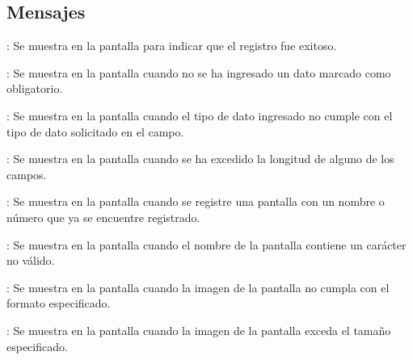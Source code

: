 \subsection{Mensajes}

\begin{Citemize}
	\item {}: Se muestra en la pantalla  para indicar que el registro fue exitoso.
	\item {}: Se muestra en la pantalla  cuando no se ha ingresado un dato marcado como obligatorio.
	\item {}: Se muestra en la pantalla  cuando el tipo de dato ingresado no cumple con el tipo de dato solicitado en el campo.
	\item {}: Se muestra en la pantalla  cuando se ha excedido la longitud de alguno de los campos.
	\item {}: Se muestra en la pantalla  cuando se registre una pantalla con un nombre o número que ya se encuentre registrado.
	\item {}: Se muestra en la pantalla  cuando el nombre de la pantalla contiene un carácter no válido.
	\item {}: Se muestra en la pantalla  cuando la imagen de la pantalla no cumpla con el formato especificado.
	\item {}: Se muestra en la pantalla  cuando la imagen de la pantalla exceda el tamaño especificado.
\end{Citemize}
